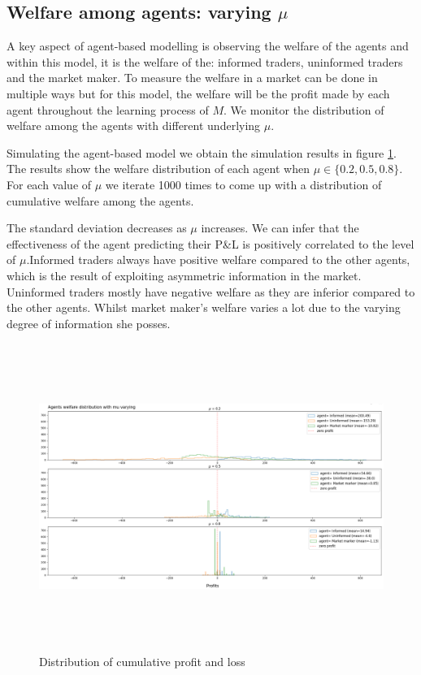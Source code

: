 \documentclass{article}
\begin{document}
\subsection{Welfare among agents: varying $\mu$}\label{Welfare}
A key aspect of agent-based modelling is observing the welfare of the agents and within this model, it is the welfare of the: informed traders, uninformed traders and the market maker. To measure the welfare in a market can be done in multiple ways but for this model, the welfare will be the profit made by each agent throughout the learning process of $M$. We monitor the distribution of welfare among the agents with different underlying $\mu$.

Simulating the agent-based model we obtain the simulation results in figure \ref{fig:pnl distribution}. The results show the welfare distribution of each agent when $\mu  \in \{0.2,0.5,0.8\}$. For each value of $\mu$ we iterate 1000 times to come up with a distribution of cumulative welfare among the agents.   

The standard deviation decreases as $\mu$ increases. We can infer that the effectiveness of the agent predicting their P\&L is positively correlated to the level of $\mu$.Informed traders always have positive welfare compared to the other agents, which is the result of exploiting asymmetric information in the market. Uninformed traders mostly have negative welfare as they are inferior compared to the other agents. Whilst market maker's welfare varies a lot due to the varying degree of information she posses. 

\begin{figure}[ht]
    \centering
    \includegraphics[width=17cm,height=10cm]{welfare.png}
    \caption{Distribution of cumulative profit and loss}
    \label{fig:pnl distribution}
\end{figure}
\end{document}
